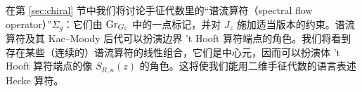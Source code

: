 在第 \ref{sec:chiral} 节中我们将讨论手征代数里的“谱流算符（spectral flow operator）”$\Sigma_g$：它们由 ${\mathrm{Gr}}_{G_{\mathbb C}}$ 中的一点标记，并对 $J_z$ 施加适当版本的约束。谱流算符及其 Kac–Moody 后代可以扮演边界 't Hooft 算符端点的角色。我们将看到存在某些（连续的）谱流算符的线性组合，它们是中心元，因而可以扮演体 't Hooft 算符端点的像 $S_{R,n}(z)$ 的角色。这将使我们能用二维手征代数的语言表述 Hecke 算符。

%
%
%
%

